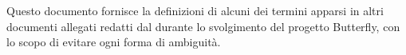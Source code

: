 Questo documento fornisce la definizioni di alcuni dei termini apparsi in altri documenti allegati redatti 
dal \gruppo durante lo svolgimento del progetto Butterfly, con
lo scopo di evitare ogni forma di ambiguit\`a.